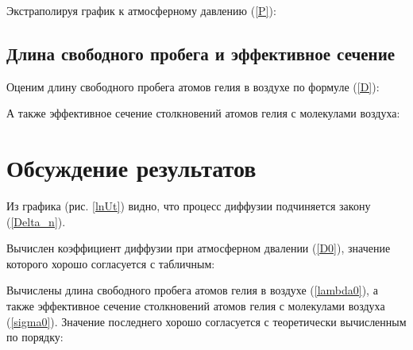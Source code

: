 \documentclass[a4paper,12pt]{article} %
\begin{document}
Экстраполируя график к атмосферному давлению (\ref{P}):
\begin{equation}\label{D0}
    
\end{equation}

\FloatBarrier

\subsection*{Длина свободного пробега и эффективное сечение}

Оценим длину свободного пробега атомов гелия в воздухе по формуле (\ref{D}):
\begin{equation}\label{lambda0}
    
\end{equation}

А также эффективное сечение столкновений атомов гелия с молекулами воздуха:
\begin{equation}\label{sigma0}
    
\end{equation}

\section{Обсуждение результатов}

Из графика (рис. \ref{lnUt}) видно, что процесс диффузии подчиняется закону (\ref{Delta_n}).

Вычислен коэффициент диффузии при атмосферном двалении (\ref{D0}), значение которого хорошо согласуется с табличным:
\begin{equation}\label{D_real}
    
\end{equation}

Вычислены длина свободного пробега атомов гелия в воздухе (\ref{lambda0}), а также эффективное сечение столкновений атомов гелия с молекулами воздуха (\ref{sigma0}). Значение последнего хорошо согласуется с теоретически вычисленным по порядку:
\begin{equation}\label{sigma_real}
    
\end{equation}
\end{document}
